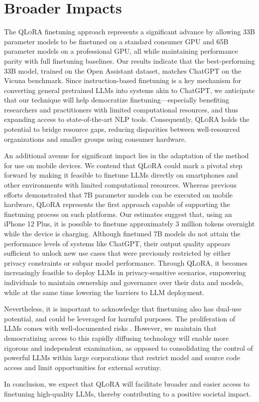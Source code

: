 \section{Broader Impacts}

The \textsc{QLoRA} finetuning approach represents a significant advance by allowing 33B parameter models to be finetuned on a standard consumer GPU and 65B parameter models on a professional GPU, all while maintaining performance parity with full finetuning baselines. Our results indicate that the best-performing 33B model, trained on the Open Assistant dataset, matches ChatGPT on the Vicuna benchmark. Since instruction-based finetuning is a key mechanism for converting general pretrained LLMs into systems akin to ChatGPT, we anticipate that our technique will help democratize finetuning—especially benefiting researchers and practitioners with limited computational resources, and thus expanding access to state-of-the-art NLP tools. Consequently, \textsc{QLoRA} holds the potential to bridge resource gaps, reducing disparities between well-resourced organizations and smaller groups using consumer hardware.

An additional avenue for significant impact lies in the adaptation of the method for use on mobile devices. We contend that \textsc{QLoRA} could mark a pivotal step forward by making it feasible to finetune LLMs directly on smartphones and other environments with limited computational resources. Whereas previous efforts demonstrated that 7B parameter models can be executed on mobile hardware, \textsc{QLoRA} represents the first approach capable of supporting the finetuning process on such platforms. Our estimates suggest that, using an iPhone 12 Plus, it is possible to finetune approximately 3 million tokens overnight while the device is charging. Although finetuned 7B models do not attain the performance levels of systems like ChatGPT, their output quality appears sufficient to unlock new use cases that were previously restricted by either privacy constraints or subpar model performance. Through \textsc{QLoRA}, it becomes increasingly feasible to deploy LLMs in privacy-sensitive scenarios, empowering individuals to maintain ownership and governance over their data and models, while at the same time lowering the barriers to LLM deployment.

Nevertheless, it is important to acknowledge that finetuning also has dual-use potential, and could be leveraged for harmful purposes. The proliferation of LLMs comes with well-documented risks \citep{bommasani2021opportunities,bender2021dangers}. However, we maintain that democratizing access to this rapidly diffusing technology will enable more rigorous and independent examination, as opposed to consolidating the control of powerful LLMs within large corporations that restrict model and source code access and limit opportunities for external scrutiny.

In conclusion, we expect that \textsc{QLoRA} will facilitate broader and easier access to finetuning high-quality LLMs, thereby contributing to a positive societal impact.